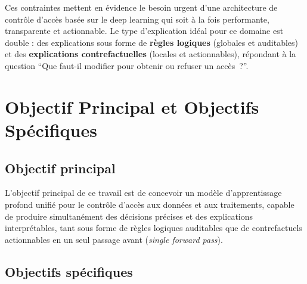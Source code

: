 \documentclass[12pt,a4paper]{article}
\begin{document}
Ces contraintes mettent en \'evidence le besoin urgent d'une architecture de contr\^ole d'acc\`es bas\'ee sur le deep learning qui soit \`a la fois performante, transparente et actionnable. Le type d'explication id\'eal pour ce domaine est double : des explications sous forme de \textbf{r\`egles logiques} (globales et auditables) et des \textbf{explications contrefactuelles} (locales et actionnables), r\'epondant \`a la question ``Que faut-il modifier pour obtenir ou refuser un acc\`es~?''.

\section{Objectif Principal et Objectifs Sp\'ecifiques}

\subsection{Objectif principal}

L'objectif principal de ce travail est de concevoir un mod\`ele d'apprentissage profond unifi\'e pour le contr\^ole d'acc\`es aux donn\'ees et aux traitements, capable de produire simultan\'ement des d\'ecisions pr\'ecises et des explications interpr\'etables, tant sous forme de r\`egles logiques auditables que de contrefactuels actionnables en un seul passage avant (\textit{single forward pass}).

\subsection{Objectifs sp\'ecifiques}
\end{document}

